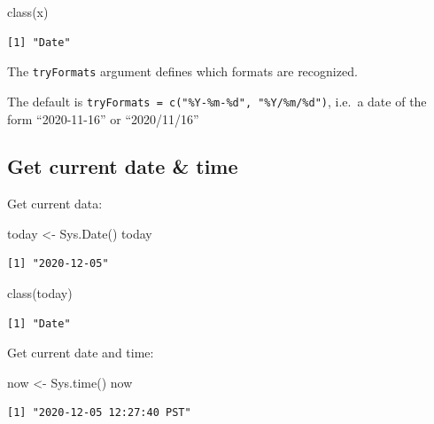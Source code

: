 \documentclass[
]{book}
\newenvironment{Shaded}{\begin{snugshade}}{\end{snugshade}}
\newcommand{\FunctionTok}[1]{\textcolor[rgb]{0.00,0.00,0.00}{#1}}
\newcommand{\NormalTok}[1]{#1}
\newcommand{\OtherTok}[1]{\textcolor[rgb]{0.56,0.35,0.01}{#1}}
\begin{document}
\begin{Shaded}
\begin{Highlighting}[]
\FunctionTok{class}\NormalTok{(x)}
\end{Highlighting}
\end{Shaded}

\begin{verbatim}
[1] "Date"
\end{verbatim}

The \texttt{tryFormats} argument defines which formats are recognized.

The default is \texttt{tryFormats\ =\ c("\%Y-\%m-\%d",\ "\%Y/\%m/\%d")}, i.e.~a date of the form ``2020-11-16'' or ``2020/11/16''

\hypertarget{get-current-date-time}{%
\subsection{Get current date \& time}\label{get-current-date-time}}

Get current data:

\begin{Shaded}
\begin{Highlighting}[]
\NormalTok{today }\OtherTok{\textless{}{-}} \FunctionTok{Sys.Date}\NormalTok{()}
\NormalTok{today}
\end{Highlighting}
\end{Shaded}

\begin{verbatim}
[1] "2020-12-05"
\end{verbatim}

\begin{Shaded}
\begin{Highlighting}[]
\FunctionTok{class}\NormalTok{(today)}
\end{Highlighting}
\end{Shaded}

\begin{verbatim}
[1] "Date"
\end{verbatim}

Get current date and time:

\begin{Shaded}
\begin{Highlighting}[]
\NormalTok{now }\OtherTok{\textless{}{-}} \FunctionTok{Sys.time}\NormalTok{()}
\NormalTok{now}
\end{Highlighting}
\end{Shaded}

\begin{verbatim}
[1] "2020-12-05 12:27:40 PST"
\end{verbatim}
\end{document}
